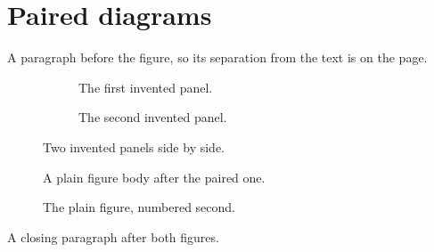 \documentclass{article}
\begin{document}
\section{Paired diagrams}

A paragraph before the figure, so its separation from the text is on the
page.

\begin{figure}
\centering
\begin{subfigure}[t]{0.48\textwidth}
\centering
{}
\caption{The first invented panel.}
\end{subfigure}
\hfill
\begin{subfigure}[t]{0.48\textwidth}
\centering
{}
\caption{The second invented panel.}
\end{subfigure}
\caption{Two invented panels side by side.}
\end{figure}

\begin{figure}
\centering
A plain figure body after the paired one.
\caption{The plain figure, numbered second.}
\end{figure}

A closing paragraph after both figures.
\end{document}
